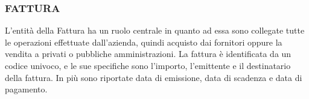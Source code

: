 \subsubsection{FATTURA}
L'entità della Fattura ha un ruolo centrale in quanto ad essa sono collegate tutte le operazioni effettuate dall'azienda, quindi acquisto dai fornitori oppure la vendita a privati o pubbliche amministrazioni.\newline
La fattura è identificata da un codice univoco, e le sue specifiche sono l'importo, l'emittente e il destinatario della fattura. In più sono riportate data di emissione, data di scadenza e data di pagamento.\newline
\noindent{}



